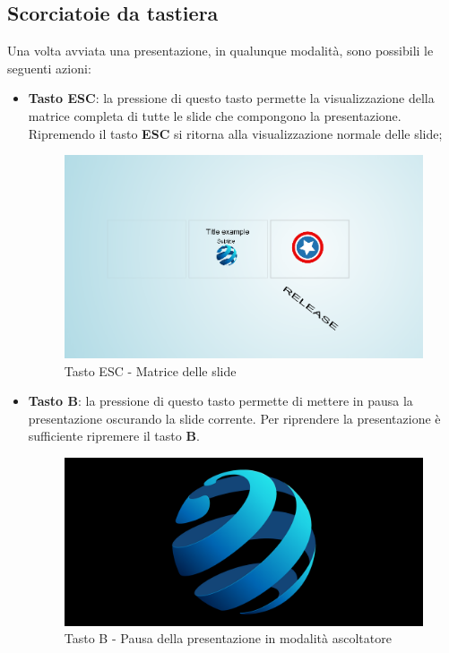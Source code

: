 \subsection{Scorciatoie da tastiera}
\noindent Una volta avviata una presentazione, in qualunque modalità, sono possibili le seguenti azioni:
\begin{itemize}
	\item \textbf{Tasto ESC}: la pressione di questo tasto permette la visualizzazione della matrice completa di tutte le slide che compongono la presentazione. Ripremendo il tasto \textbf{ESC} si ritorna alla visualizzazione normale delle slide;
	\begin{figure}[H] 
		\centering 
		\includegraphics[scale=0.40] {img/anteprima.png}
		\caption{Tasto ESC - Matrice delle slide} 
	\end{figure}
	\item \textbf{Tasto B}: la pressione di questo tasto permette di mettere in pausa la presentazione oscurando la slide corrente. Per riprendere la presentazione è sufficiente ripremere il tasto \textbf{B}.
	\begin{figure}[H] 
		\centering 
		\includegraphics[scale=0.20] {img/b.png}
		\caption{Tasto B - Pausa della presentazione in modalità ascoltatore} 
	\end{figure}
	

\end{itemize}
